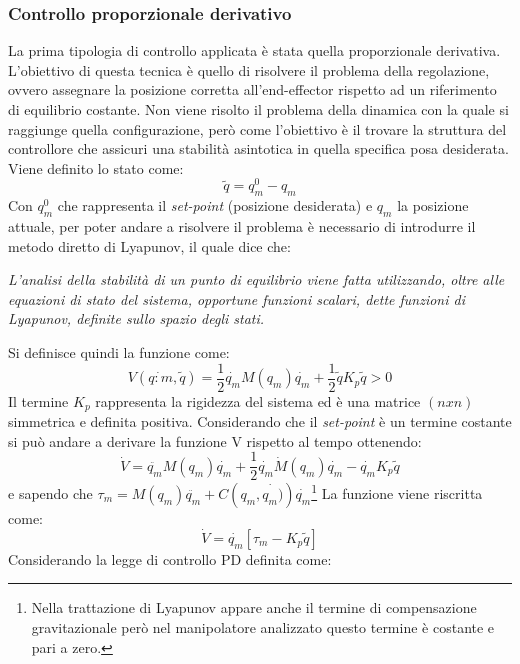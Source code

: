 \subsubsection{Controllo proporzionale derivativo}
La prima tipologia di controllo applicata è stata quella proporzionale derivativa. L'obiettivo di questa tecnica è quello di risolvere il problema della regolazione, ovvero assegnare la posizione corretta all'end-effector rispetto ad un riferimento di equilibrio costante. Non viene risolto il problema della dinamica con la quale si raggiunge quella configurazione, però come l'obiettivo è il trovare la struttura del controllore che assicuri una stabilità asintotica in quella specifica posa desiderata. Viene definito lo stato come: 
\begin{equation}
\tilde{q} = q^0_m - q_m
\end{equation}
Con $q^0_m$ che rappresenta il \textit{set-point} (posizione desiderata) e $q_m$ la posizione attuale, per poter andare a risolvere il problema è necessario di introdurre il metodo diretto di Lyapunov, il quale dice che: 
\begin{center}
\textit{L’analisi della stabilità di un punto di equilibrio viene fatta utilizzando, oltre alle equazioni di stato del sistema, opportune funzioni scalari, dette funzioni di Lyapunov, definite sullo spazio degli stati. }
\end{center}
Si definisce quindi la funzione come:
\begin{equation}
V(\dot{q:m},\tilde{q}) = \frac{1}{2} \dot{q_m}M(q_m)\dot{q_m} + \frac{1}{2} \tilde{q}K_p \tilde{q} >0
\end{equation}
Il termine $K_p$ rappresenta la rigidezza del sistema ed è una matrice $(n x n)$ simmetrica e definita positiva. Considerando che il \textit{set-point} è un termine costante si può andare a derivare la funzione V rispetto al tempo ottenendo:
\begin{equation*}
\dot{V} = \ddot{q_m}M(q_m)\dot{q_m}+\frac{1}{2} \dot{q_m}\dot{M}(q_m)\dot{q_m}-\dot{q_m}K_p\tilde{q}
\end{equation*}
e sapendo che $\tau_m = M(q_m)\ddot{q_m} + C(q_m,\dot{q_m)})\dot{q_m}$\footnote{Nella trattazione di Lyapunov appare anche il termine di compensazione gravitazionale però nel manipolatore analizzato questo termine è costante e pari a zero.} La funzione viene riscritta come: 
\begin{equation}
\dot{V} = \dot{q_m} [\tau_m - K_p \tilde{q}]
\label{eq:finLap}
\end{equation}
Considerando la legge di controllo PD definita come:
